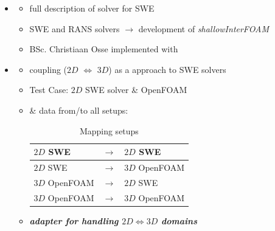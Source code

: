 \begin{frame}

\begin{multicols}{2}
\begin{itemize}
\item<2->[]    
 \vspace{3em}
 \begin{itemize}
  \setlength\itemsep{2em}
  \item  full description of   solver for  SWE \cite{mintgen}
 \item  {} SWE and  RANS solvers $\rightarrow$ development of \textit{shallowInterFOAM} \cite{mintgen}
 \item BSc. Christiaan Osse implemented \cite{mintgen} with 
 \end{itemize}
    
\vfill\columnbreak

\item<3->[]
\vspace{3em}
 \begin{itemize}
    \setlength\itemsep{2em}

 \item<4->  \cite{mintgen} coupling ($2D$ $\Longleftrightarrow$ $3D$) as a  approach to SWE solvers
 \item<5-> Test Case: $2D$ SWE solver \& OpenFOAM 
 \item<6->  \&  data from/to all setups: \vspace{0.4cm}
\begin{table}[]
\begin{tabular}{|lll|}\hline
$2D$ SWE       & $\rightarrow$ & $2D$ SWE       \\ \hline
$2D$ SWE       & $\rightarrow$ & $3D$ OpenFOAM \\ \hline
$3D$ OpenFOAM & $\rightarrow$ & $2D$ SWE       \\ \hline
$3D$ OpenFOAM & $\rightarrow$ & $3D$ OpenFOAM \\ \hline
\end{tabular}
\caption{Mapping setups}
\label{table:1}
\end{table}
\item<7-> \textbf{\textit{ adapter for handling $2D\Longleftrightarrow3D$ domains}}
\end{itemize}
\end{itemize}
\end{multicols}


\end{frame}


